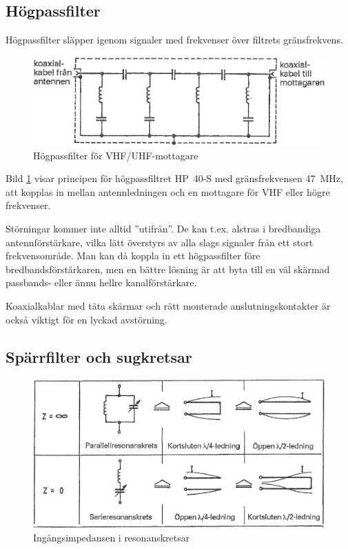 \subsection{Högpassfilter}

Högpassfilter släpper igenom signaler med frekvenser över filtrets
gränsfrekvens.

\begin{figure}
  \includegraphics[width=\textwidth]{images/cropped_pdfs/bild_2_9-03.pdf}
  \caption{Högpassfilter för VHF/UHF-mottagare}
  \label{fig:bildII9-3}
\end{figure}

Bild \ref{fig:bildII9-3} visar principen för högpassfiltret HP~40-S med
gränsfrekvensen 47~MHz, att kopplas in mellan antennledningen och en
mottagare för VHF eller högre frekvenser.

Störningar kommer inte alltid ''utifrån''. De kan t.ex. alstras i bredbandiga
antennförstärkare, vilka lätt överstyrs av alla slags signaler från ett stort
frekvensområde. Man kan då koppla in ett högpassfilter före
bredbandsförstärkaren, men en bättre lösning är att byta till en väl skärmad
passbands- eller ännu hellre kanalförstärkare.

Koaxialkablar med täta skärmar och rätt monterade anslutningskontakter
är också viktigt för en lyckad avstörning.

\subsection{Spärrfilter och sugkretsar}

\begin{figure}
  \includegraphics[width=\textwidth]{images/cropped_pdfs/bild_2_9-04.pdf}
  \caption{Ingångsimpedansen i resonanskretsar}
  \label{fig:bildII9-4}
\end{figure}

